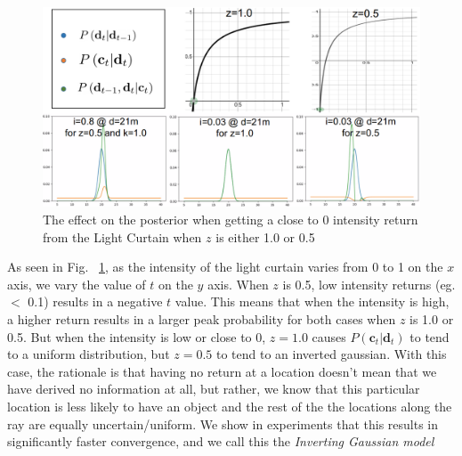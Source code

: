 \begin{figure}[h]
   \centering
   \begin{minipage}{0.5\textwidth}
       \centering
       \includegraphics[width=1.0\textwidth]{figures/graphs.png}
   \end{minipage}\hfill
   \centering
   \caption{The effect on the posterior when getting a close to 0 intensity return from the Light Curtain when $z$ is either 1.0 or 0.5}
   \label{fig:updatemodel}
\end{figure}

As seen in Fig. ~\ref{fig:updatemodel}, as the intensity of the light curtain varies from 0 to 1 on the $x$ axis, we vary the value of $t$ on the $y$ axis. When $z$ is 0.5, low intensity returns (eg. $<$ 0.1) results in a negative $t$ value. This means that when the intensity is high, a higher return results in a larger peak probability for both cases when $z$ is 1.0 or 0.5. But when the intensity is low or close to 0, $z=1.0$ causes $P\left(\mathbf{c}_{t}|\mathbf{d}_{t}\right)$ to tend to a uniform distribution, but $z=0.5$ to tend to an inverted gaussian. With this case, the rationale is that having no return at a location doesn't mean that we have derived no information at all, but rather, we know that this particular location is less likely to have an object and the rest of the the locations along the ray are equally uncertain/uniform. We show in experiments that this results in significantly faster convergence, and we call this the \textit{Inverting Gaussian model}